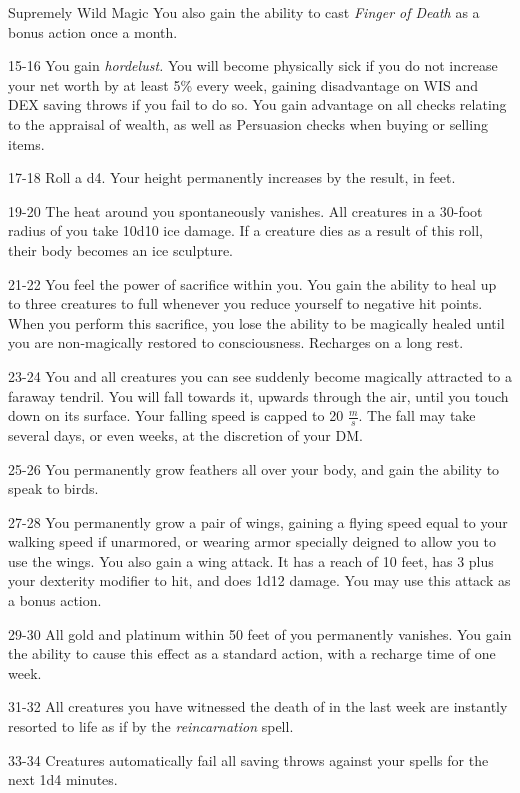 \begin{rolltable}[0.9\textheight/0pt]{Supremely Wild Magic}
You also gain the ability to cast \textit{Finger of Death} as a bonus action once a month.
\item[15-16] You gain \textit{hordelust.}
You will become physically sick if you do not increase your net worth by at least 5\% every week, gaining disadvantage on WIS and DEX saving throws if you fail to do so.
You gain advantage on all checks relating to the appraisal of wealth, as well as Persuasion checks when buying or selling items.
\item[17-18]  Roll a d4. Your height permanently increases by the result, in feet.
\item[19-20] The heat around you spontaneously vanishes.
All creatures in a 30-foot radius of you take 10d10 ice damage. 
If a creature dies as a result of this roll, their body becomes an ice sculpture.
\item[21-22] You feel the power of sacrifice within you.
You gain the ability to heal up to three creatures to full whenever you reduce yourself to negative hit points.
When you perform this sacrifice, you lose the ability to be magically healed until you are non-magically restored to consciousness.
Recharges on a long rest.
\item[23-24] You and all creatures you can see suddenly become magically attracted to a faraway tendril. 
You will fall towards it, upwards through the air, until you touch down on its surface.
Your falling speed is capped to 20 $\frac{m}{s}$.
The fall may take several days, or even weeks, at the discretion of your DM.
\item[25-26] You permanently grow feathers all over your body, and gain the ability to speak to birds.
\item[27-28] You permanently grow a pair of wings, gaining a flying speed equal to your walking speed if unarmored, or wearing armor specially deigned to allow you to use the wings.
You also gain a wing attack. 
It has a reach of 10 feet, has 3 plus your dexterity modifier to hit, and does 1d12 damage.
You may use this attack as a bonus action.
\item[29-30] All gold and platinum within 50 feet of you permanently vanishes.
You gain the ability to cause this effect as a standard action, with a recharge time of one week.
\item[31-32] All creatures you have witnessed the death of in the last week are instantly resorted to life as if by the \textit{reincarnation} spell.
\item[33-34] Creatures automatically fail all saving throws against your spells for the next 1d4 minutes.

\end{rolltable}
